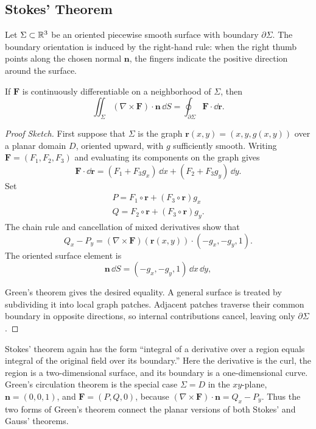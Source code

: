 \subsection{Stokes' Theorem}

Let $\Sigma\subset\mathbb{R}^3$ be an oriented piecewise smooth surface with boundary $\partial\Sigma$. The boundary orientation is induced by the right-hand rule: when the right thumb points along the chosen normal $\mathbf{n}$, the fingers indicate the positive direction around the surface.

\begin{theorem}
\label{thm:stokes}
If $\mathbf{F}$ is continuously differentiable on a neighborhood of $\Sigma$, then
\begin{equation}
\iint_\Sigma(\nabla\times\mathbf{F})\cdot\mathbf{n}\,\dd S
=\oint_{\partial\Sigma}\mathbf{F}\cdot\dd\mathbf{r}.
\end{equation}

\end{theorem}

\begin{proof}[Proof Sketch]
First suppose that $\Sigma$ is the graph $\mathbf{r}(x,y)=(x,y,g(x,y))$ over a planar domain $D$, oriented upward, with $g$ sufficiently smooth. Writing $\mathbf{F}=(F_1,F_2,F_3)$ and evaluating its components on the graph gives
\[
\mathbf{F}\cdot\dd\mathbf{r}
=(F_1+F_3g_x)\,\dd x+(F_2+F_3g_y)\,\dd y.
\]
Set
\[
\begin{gathered}
P=F_1\circ\mathbf{r}+(F_3\circ\mathbf{r})g_x \\
Q=F_2\circ\mathbf{r}+(F_3\circ\mathbf{r})g_y.
\end{gathered}
\]
The chain rule and cancellation of mixed derivatives show that
\[
Q_x-P_y=(\nabla\times\mathbf{F})(\mathbf{r}(x,y))\cdot(-g_x,-g_y,1).
\]
The oriented surface element is
\[
\mathbf{n}\,\dd S=(-g_x,-g_y,1)\,\dd x\,\dd y,
\]

Green's theorem gives the desired equality. A general surface is treated by subdividing it into local graph patches. Adjacent patches traverse their common boundary in opposite directions, so internal contributions cancel, leaving only $\partial\Sigma$.
\end{proof}

\begin{remark}
Stokes' theorem again has the form ``integral of a derivative over a region equals integral of the original field over its boundary.'' Here the derivative is the curl, the region is a two-dimensional surface, and its boundary is a one-dimensional curve. Green's circulation theorem is the special case $\Sigma=D$ in the $xy$-plane, $\mathbf{n}=(0,0,1)$, and $\mathbf{F}=(P,Q,0)$, because $(\nabla\times\mathbf{F})\cdot\mathbf{n}=Q_x-P_y$. Thus the two forms of Green's theorem connect the planar versions of both Stokes' and Gauss' theorems.
\end{remark}
